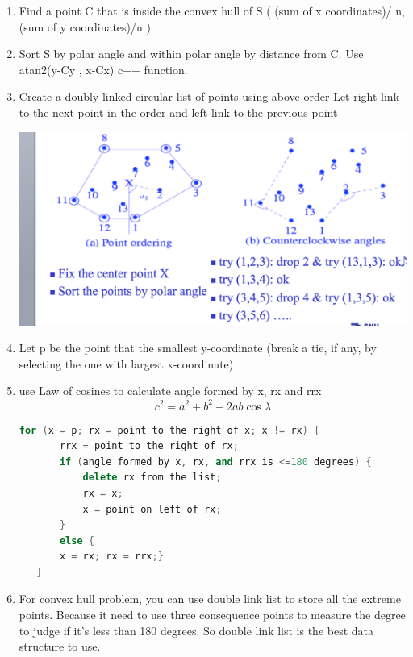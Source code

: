 \documentclass[a4paper,11pt,twoside]{book}
\begin{document}
\begin{enumerate}
\item Find a point C that is inside the convex hull of S
( (sum of x coordinates)/ n, (sum of y coordinates)/n )
\item Sort S by polar angle and within polar angle by distance from C. Use atan2(y-Cy , x-Cx) c++ function.
\item Create a doubly linked circular list of points using above order
Let right link to the next point in the order and left link to the previous point

\includegraphics[scale=0.4]{pics/convex.png} \newline
\item Let p be the point that the smallest y-coordinate 
   (break a tie, if any, by selecting the one with largest x-coordinate)
   
\item use Law of cosines to calculate  angle formed by x, rx and rrx
\[
c^{2} = a^{2}+b^{2}-2ab\cos\lambda
\]

\begin{lstlisting}[frame=single, language=c++]
 for (x = p; rx = point to the right of x; x != rx) {
       rrx = point to the right of rx;
       if (angle formed by x, rx, and rrx is <=180 degrees) {
           delete rx from the list;
           rx = x; 
           x = point on left of rx;
       } 
       else { 
       x = rx; rx = rrx;}
   } 
\end{lstlisting}

\item For convex hull problem, you can use double link list to store all the extreme points. Because it need to use three consequence points to measure the degree to judge if it's less than 180 degrees. So double link list is the best data structure to use. 

\end{enumerate}
\end{document}
